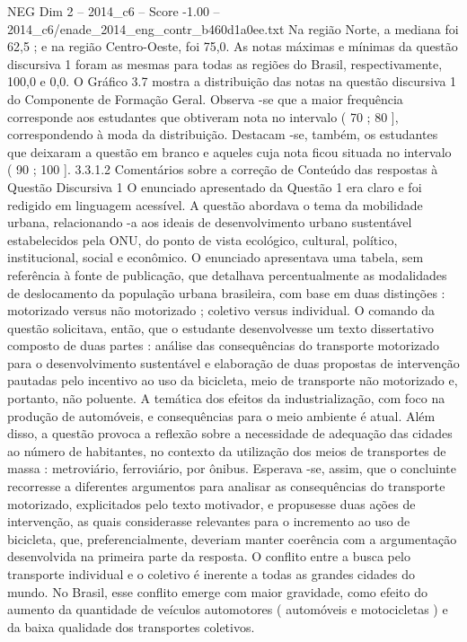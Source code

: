 \begin{textsample}{NEG Dim 2 – 2014\_c6 – Score -1.00 – 2014\_c6/enade\_2014\_eng\_contr\_b460d1a0ee.txt}
Na região Norte, a mediana foi 62,5 ; e na região Centro-Oeste, foi 75,0.
As notas máximas e mínimas da questão discursiva 1 foram as mesmas para todas as regiões do Brasil, respectivamente, 100,0 e 0,0.
O Gráfico 3.7 mostra a distribuição das notas na questão discursiva 1 do Componente de Formação Geral.
Observa -se que a maior frequência corresponde aos estudantes que obtiveram nota no intervalo ( 70 ; 80 ], correspondendo à moda da distribuição.
Destacam -se, também, os estudantes que deixaram a questão em branco e aqueles cuja nota ficou situada no intervalo ( 90 ; 100 ]. 3.3.1.2 Comentários sobre a correção de Conteúdo das respostas à Questão Discursiva 1 O enunciado apresentado da Questão 1 era claro e foi redigido em linguagem acessível.
A questão abordava o tema da mobilidade urbana, relacionando -a aos ideais de desenvolvimento urbano sustentável estabelecidos pela ONU, do ponto de vista ecológico, cultural, político, institucional, social e econômico.
O enunciado apresentava uma tabela, sem referência à fonte de publicação, que detalhava percentualmente as modalidades de deslocamento da população urbana brasileira, com base em duas distinções : motorizado versus não motorizado ; coletivo versus individual.
O comando da questão solicitava, então, que o estudante desenvolvesse um texto dissertativo composto de duas partes : análise das consequências do transporte motorizado para o desenvolvimento sustentável e elaboração de duas propostas de intervenção pautadas pelo incentivo ao uso da bicicleta, meio de transporte não motorizado e, portanto, não poluente.
A temática dos efeitos da industrialização, com foco na produção de automóveis, e consequências para o meio ambiente é atual.
Além disso, a questão provoca a reflexão sobre a necessidade de adequação das cidades ao número de habitantes, no contexto da utilização dos meios de transportes de massa : metroviário, ferroviário, por ônibus.
Esperava -se, assim, que o concluinte recorresse a diferentes argumentos para analisar as consequências do transporte motorizado, explicitados pelo texto motivador, e propusesse duas ações de intervenção, as quais considerasse relevantes para o incremento ao uso de bicicleta, que, preferencialmente, deveriam manter coerência com a argumentação desenvolvida na primeira parte da resposta.
O conflito entre a busca pelo transporte individual e o coletivo é inerente a todas as grandes cidades do mundo.
No Brasil, esse conflito emerge com maior gravidade, como efeito do aumento da quantidade de veículos automotores ( automóveis e motocicletas ) e da baixa qualidade dos transportes coletivos.

\end{textsample}
